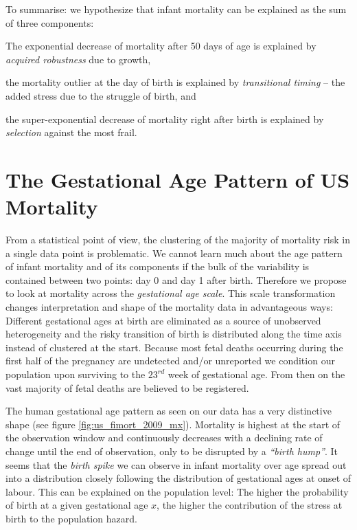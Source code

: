 \documentclass[12pt, parskip=half]{scrartcl}
\begin{document}
To summarise: we hypothesize that infant mortality can be explained as the sum of three components:
\begin{compactenum}
  \item The exponential decrease of mortality after 50 days of age is explained by \emph{acquired robustness} due to growth,
  \item the mortality outlier at the day of birth is explained by \emph{transitional timing} -- the added stress due to the struggle of birth, and
  \item the super-exponential decrease of mortality right after birth is explained by \emph{selection} against the most frail.
\end{compactenum}

\section{The Gestational Age Pattern of US Mortality} %
\label{sec:the_gestational_age_transformation}

From a statistical point of view, the clustering of the majority of mortality risk in a single data point is problematic. We cannot learn much about the age pattern of infant mortality and of its components if the bulk of the variability is contained between two points: day 0 and day 1 after birth. Therefore we propose to look at mortality across the \emph{gestational age scale}. This scale transformation changes interpretation and shape of the mortality data in advantageous ways: Different gestational ages at birth are eliminated as a source of unobserved heterogeneity and the risky transition of birth is distributed along the time axis instead of clustered at the start. Because most fetal deaths occurring during the first half of the pregnancy are undetected and/or unreported we condition our population upon surviving to the $23^{rd}$ week of gestational age. From then on the vast majority of fetal deaths are believed to be registered.

The human gestational age pattern as seen on our data has a very distinctive shape (see figure \ref{fig:us_fimort_2009_mx}). Mortality is highest at the start of the observation window and continuously decreases with a declining rate of change until the end of observation, only to be disrupted by a \emph{\enquote{birth hump}}. It seems that the \emph{birth spike} we can observe in infant mortality over age spread out into a distribution closely following the distribution of gestational ages at onset of labour. This can be explained on the population level: The higher the probability of birth at a given gestational age $x$, the higher the contribution of the stress at birth to the population hazard.
\end{document}
